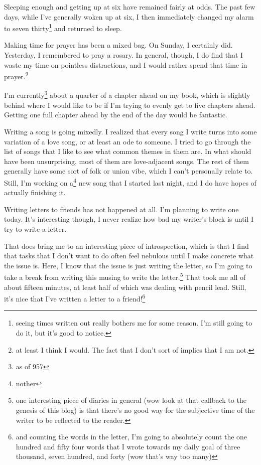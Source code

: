 \documentclass[12pt]{article}[titlepage]
\renewcommand{\,}{\textsuperscript{,}}
\begin{document}
Sleeping enough and getting up at six have remained fairly at odds.
The past few days, while I've generally woken up at six, I then immediately changed my alarm to seven thirty\footnote{seeing times written out really bothers me for some reason. I'm still going to do it, but it's good to notice.} and returned to sleep.

Making time for prayer has been a mixed bag.
On Sunday, I certainly did.
Yesterday, I remembered to pray a rosary.
In general, though, I do find that I waste my time on pointless distractions, and I would rather spend that time in prayer.\footnote{at least I think I would. The fact that I don't sort of implies that I am not.}

I'm currently\footnote{as of 957} about a quarter of a chapter ahead on my book, which is slightly behind where I would like to be if I'm trying to evenly get to five chapters ahead.
Getting one full chapter ahead by the end of the day would be fantastic.

Writing a song is going mixedly.
I realized that every song I write turns into some variation of a love song, or at least an ode to someone.
I tried to go through the list of songs that I like to see what common themes in them are.
In what should have been unsurprising, most of them are love-adjacent songs.
The rest of them generally have some sort of folk or union vibe, which I can't personally relate to.
Still, I'm working on a\footnote{nother} new song that I started last night, and I do have hopes of actually finishing it.

Writing letters to friends has not happened at all.
I'm planning to write one today.
It's interesting though, I never realize how bad my writer's block is until I try to write a letter.

That does bring me to an interesting piece of introspection, which is that I find that tasks that I don't want to do often feel nebulous until I make concrete what the issue is.
Here, I know that the issue is just writing the letter, so I'm going to take a break from writing this musing to write the letter.\footnote{one interesting piece of diaries in general (wow look at that callback to the genesis of this blog) is that there's no good way for the subjective time of the writer to be reflected to the reader.}
That took me all of about fifteen minutes, at least half of which was dealing with pencil lead.
Still, it's nice that I've written a letter to a friend!\footnote{and counting the words in the letter, I'm going to absolutely count the one hundred and fifty four words that I wrote towards my daily goal of three thousand, seven hundred, and forty (wow that's way too many)}
\end{document}
